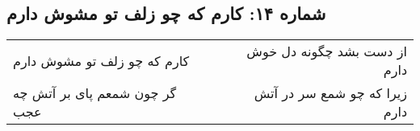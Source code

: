 \begin{center}
\section*{شماره ۱۴: کارم که چو زلف تو مشوش دارم}
\label{sec:014}
\begin{longtable}{l p{0.5cm} r}
کارم که چو زلف تو مشوش دارم
&&
از دست بشد چگونه دل خوش دارم
\\
گر چون شمعم پای بر آتش چه عجب
&&
زیرا که چو شمع سر در آتش دارم
\\
\end{longtable}
\end{center}

